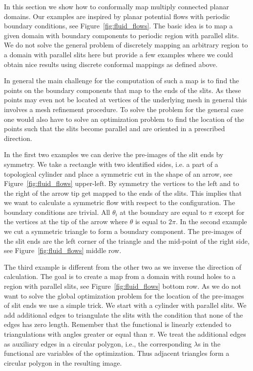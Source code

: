 \documentclass[Thesis.tex]{subfiles}
\begin{document}
In this section we show how to conformally map multiply connected planar domains.
Our examples are inspired by planar potential flows with periodic boundary conditions, see Figure~\ref{fig:fluid_flows}.
The basic idea is to map a given domain with boundary components to periodic region with parallel slits.
We do not solve the general problem of discretely mapping an arbitrary region to a domain with parallel slits here but provide a few examples where we could obtain nice results using discrete conformal mappings as defined above.

In general the main challenge for the computation of such a map is to find the points on the boundary components that map to the ends of the slits. As these points may even not be located at vertices of the underlying mesh in general this involves a mesh refinement procedure. To solve the problem for the general case one would also have to solve an optimization problem to find the location of the points such that the slits become parallel and are oriented in a prescribed direction.

In the first two examples we can derive the pre-images of the slit ends by symmetry. 
We take a rectangle with two identified sides, i.e. a part of a topological cylinder and place a symmetric cut in the shape of an arrow, see Figure~\ref{fig:fluid_flows} upper-left. 
By symmetry the vertices to the left and to the right of the arrow tip get mapped to the ends of the slits. 
This implies that we want to calculate a symmetric flow with respect to the configuration.
The boundary conditions are trivial. 
All $\theta_i$ at the boundary are equal to $\pi$ except for the vertices at the tip of the arrow where $\theta$ is equal to $2\pi$.
In the second example we cut a symmetric triangle to form a boundary component. The pre-images of the slit ends are the left corner of the triangle and the mid-point of the right side, see Figure~\ref{fig:fluid_flows} middle row.

The third example is different from the other two as we inverse the direction of calculation. 
The goal is to create a map from a domain with round holes to a region with parallel slits, see Figure~\ref{fig:fluid_flows} bottom row. 
As we do not want to solve the global optimization problem for the location of the pre-images of slit ends we use a simple trick.
We start with a cylinder with parallel slits.
We add additional edges to triangulate the slits with the condition that none of the edges has zero length.
Remember that the functional is linearly extended to triangulations with angles greater or equal than $\pi$.
We treat the additional edges as auxiliary edges in a circular polygon, i.e., the corresponding $\lambda$s in the functional are variables of the optimization. 
Thus adjacent triangles form a circular polygon in the resulting image.
\end{document}
